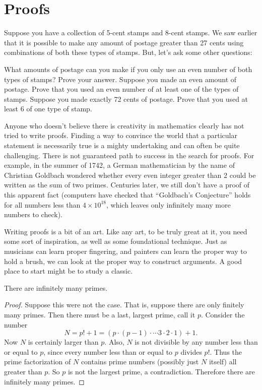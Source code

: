 \documentclass[12pt]{article}
\begin{document}
\section{Proofs}
\begin{activity}
Suppose you have a collection of 5-cent stamps and 8-cent stamps.  We saw earlier that it is possible to make any amount of postage greater than 27 cents using combinations of both these types of stamps.  But, let's ask some other questions:
\begin{questions}
\question What amounts of postage can you make if you only use an even number of both types of stamps? Prove your answer.
\vfill
\question Suppose you made an even amount of postage.  Prove that you used an even number of at least one of the types of stamps.
\vfill
\question Suppose you made exactly 72 cents of postage.  Prove that you used at least 6 of one type of stamp.
\vfill
\end{questions}

\end{activity}


Anyone who doesn't believe there is creativity in mathematics clearly has not tried to write proofs.  Finding a way to convince the world that a particular statement is necessarily true is a mighty undertaking and can often be quite challenging.  There is not guaranteed path to success in the search for proofs.  For example, in the summer of 1742, a German mathematician by the name of Christian Goldbach wondered whether every even integer greater than 2 could be written as the sum of two primes.  Centuries later, we still don't have a proof of this apparent fact (computers have checked that ``Goldbach's Conjecture'' holds for all numbers less than $4\times 10^{18}$, which leaves only infinitely many more numbers to check). 

Writing proofs is a bit of an art.  Like any art, to be truly great at it, you need some sort of inspiration, as well as some foundational technique.  Just as musicians can learn proper fingering, and painters can learn the proper way to hold a brush, we can look at the proper way to construct arguments.  A good place to start might be to study a classic.


 \begin{theorem}
  There are infinitely many primes.
 \end{theorem}
 
 \begin{proof}
  Suppose this were not the case.  That is, suppose there are only finitely many primes.  Then there must be a last, largest prime, call it $p$. Consider the number 
  \[N = p! + 1 = (p \cdot (p-1) \cdot \cdots 3\cdot 2 \cdot 1) + 1.\]
  Now $N$ is certainly larger than $p$.  Also, $N$ is not divisible by any number less than or equal to $p$, since every number less than or equal to $p$ divides $p!$.  Thus the prime factorization of $N$ contains prime numbers (possibly just $N$ itself) all greater than $p$.  So $p$ is not the largest prime, a contradiction.  Therefore there are infinitely many primes.
 \end{proof}
 
\end{document}
